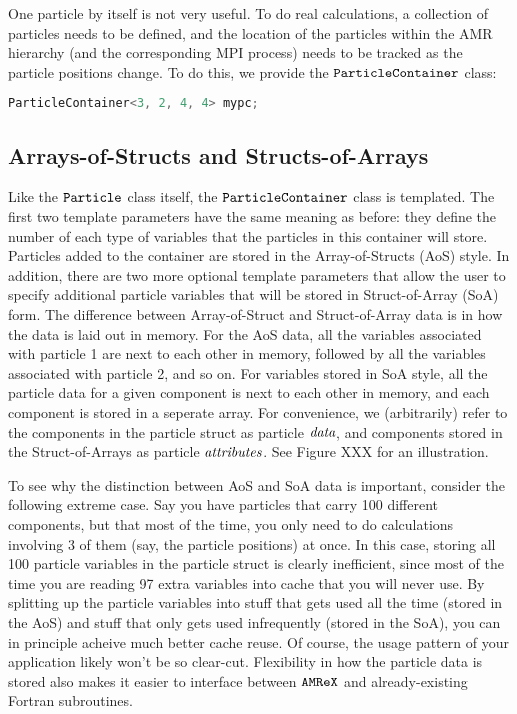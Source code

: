 One particle by itself is not very useful. To do real calculations, a collection of particles needs to be defined, and the location of the particles within the AMR hierarchy
(and the corresponding MPI process) needs to be tracked as the particle positions change. To do this, we provide the $\tt{ParticleContainer}$ class:

\begin{lstlisting}[language=cpp]
  ParticleContainer<3, 2, 4, 4> mypc;
\end{lstlisting}
   
\subsection{Arrays-of-Structs and Structs-of-Arrays}

Like the $\tt{Particle}$ class itself, the $\tt{ParticleContainer}$ class is templated. The first two template parameters have the same meaning as before: they define the number of each type of variables that the particles in this container will store. Particles added to the container are stored in the Array-of-Structs (AoS) style. In addition, there are two more optional template parameters that allow the user to specify additional particle variables that will be stored in Struct-of-Array (SoA) form. The difference between Array-of-Struct and Struct-of-Array data is in how the data is laid out in memory. For the AoS data, all the variables associated with particle 1 are next to each other in memory, followed by all the variables associated with particle 2, and so on. For variables stored in SoA style, all the particle data for a given component is next to each other in memory, and each component is stored in a seperate
array. For convenience, we (arbitrarily) refer to the components in the particle struct as particle $\emph{data}$, and components stored in the Struct-of-Arrays as particle
$\emph{attributes}$. See Figure XXX for an illustration.

To see why the distinction between AoS and SoA data is important, consider the following extreme case. Say you have particles that carry 100 different components,
but that most of the time, you only need to do calculations involving 3 of them (say, the particle positions) at once. In this case, storing all 100 particle variables in the particle
struct is clearly inefficient, since most of the time you are reading 97 extra variables into cache that you will never use. By splitting up the particle variables into stuff that gets 
used all the time (stored in the AoS) and stuff that only gets used infrequently (stored in the SoA), you can in principle acheive much better cache reuse. Of course, the usage pattern of your application likely won't be so clear-cut. Flexibility in how the particle data is stored also makes it easier to interface between $\tt{AMReX}$ and already-existing Fortran subroutines.

